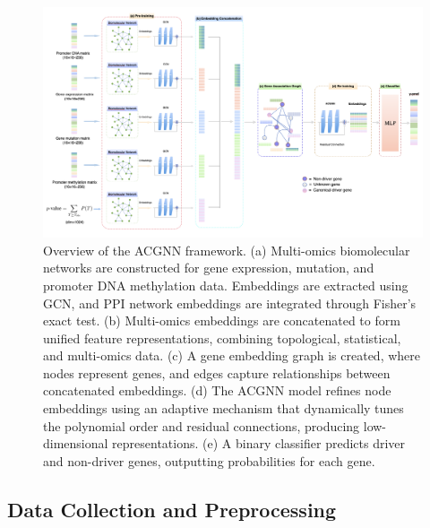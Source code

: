 \begin{figure}
	\centering
	\scriptsize
	\captionsetup{font=footnotesize}
	\includegraphics[width=18cm]{images/__overview_framework.png}
	\vspace{0.5cm} %
	\caption{Overview of the ACGNN framework.
		(a) Multi-omics biomolecular networks are constructed for gene expression, mutation, and promoter DNA methylation data. Embeddings are extracted using GCN, and PPI network embeddings are integrated through Fisher's exact test.
		(b) Multi-omics embeddings are concatenated to form unified feature representations, combining topological, statistical, and multi-omics data.
		(c) A gene embedding graph is created, where nodes represent genes, and edges capture relationships between concatenated embeddings.
		(d) The ACGNN model refines node embeddings using an adaptive mechanism that dynamically tunes the polynomial order and residual connections, producing low-dimensional representations.
		(e) A binary classifier predicts driver and non-driver genes, outputting probabilities for each gene.}
	\label{overview}
\end{figure}

\subsection{Data Collection and Preprocessing}

